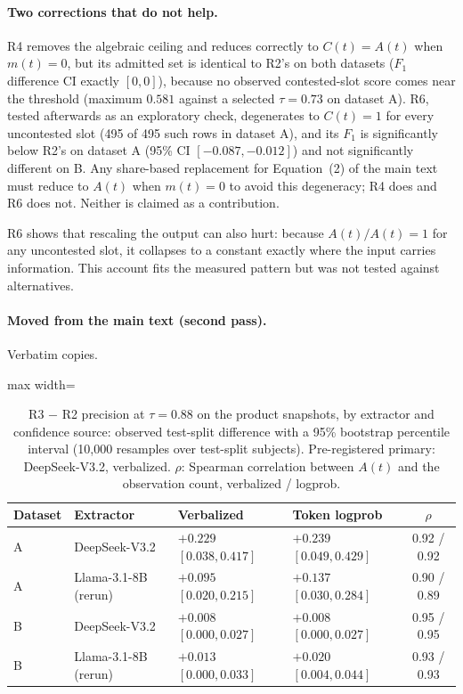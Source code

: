 \documentclass[11pt]{article}
\begin{document}
\paragraph{Two corrections that do not help.} R4 removes the algebraic
ceiling and reduces correctly to $C(t)=A(t)$ when $m(t)=0$, but its
admitted set is identical to R2's on both datasets ($F_1$ difference
CI exactly $[0,0]$), because no observed contested-slot score comes
near the threshold (maximum $0.581$ against a selected $\tau=0.73$ on
dataset A). R6, tested afterwards as an exploratory check, degenerates
to $C(t)=1$ for every uncontested slot (495 of 495 such rows in dataset
A), and its $F_1$ is significantly below R2's on dataset A (95\% CI
$[-0.087, -0.012]$) and not significantly different on B. Any
share-based replacement for Equation~(2) of the main text must reduce to
$A(t)$ when $m(t)=0$ to avoid this degeneracy; R4 does and R6 does not.
Neither is claimed as a contribution.

R6 shows that rescaling the output can
also hurt: because $A(t)/A(t)=1$ for any uncontested slot, it collapses
to a constant exactly where the input carries information. This account
fits the measured pattern but was not tested against alternatives.


\paragraph{Moved from the main text (second pass).} Verbatim copies.

\begin{table}[htbp]
\centering
\caption{R3 $-$ R2 precision at $\tau=0.88$ on the product snapshots, by
extractor and confidence source: observed test-split difference with a
95\% bootstrap percentile interval (10,000 resamples over test-split
subjects). Pre-registered primary: DeepSeek-V3.2, verbalized.
$\rho$: Spearman correlation between $A(t)$ and the observation count,
verbalized / logprob.}
\label{tab:s2-dec036}
\small
\begin{adjustbox}{max width=\textwidth}
\begin{tabular}{@{}llllc@{}}
\toprule
Dataset & Extractor & Verbalized & Token logprob & $\rho$ \\
\midrule
A & DeepSeek-V3.2 & $+0.229$ $[0.038, 0.417]$ & $+0.239$ $[0.049, 0.429]$ & 0.92 / 0.92 \\
A & Llama-3.1-8B (rerun) & $+0.095$ $[0.020, 0.215]$ & $+0.137$ $[0.030, 0.284]$ & 0.90 / 0.89 \\
B & DeepSeek-V3.2 & $+0.008$ $[0.000, 0.027]$ & $+0.008$ $[0.000, 0.027]$ & 0.95 / 0.95 \\
B & Llama-3.1-8B (rerun) & $+0.013$ $[0.000, 0.033]$ & $+0.020$ $[0.004, 0.044]$ & 0.93 / 0.93 \\
\bottomrule
\end{tabular}
\end{adjustbox}
\end{table}
\end{document}
